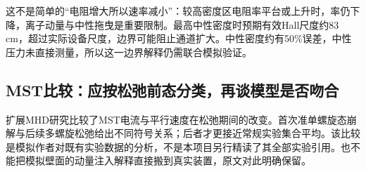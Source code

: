 这不是简单的“电阻增大所以速率减小”：较高密度区电阻率平台或上升时，率仍下降，离子动量与中性拖曳是重要限制。最高中性密度时预期有效Hall尺度约83 cm，超过实际设备尺度，边界可能阻止通道扩大。中性密度约有50\%误差，中性压力未直接测量，所以这一边界解释仍需联合模拟验证。

\subsection{MST比较：应按松弛前态分类，再谈模型是否吻合}
扩展MHD研究\citep{F798}比较了MST电流与平行速度在松弛期间的改变。首次准单螺旋态崩解与后续多螺旋松弛给出不同符号关系；后者才更接近常规实验集合平均。该比较是模拟作者对既有实验数据的分析，不是本项目另行精读了其全部实验引用。也不能把模拟壁面的动量注入解释直接搬到真实装置，原文对此明确保留。
